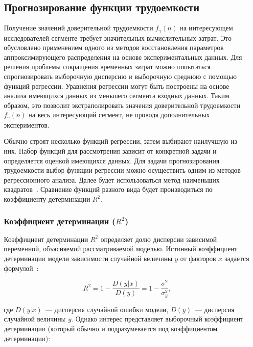 \documentclass[a4paper, article, 14pt]{extarticle}
\begin{document}
\subsection{Прогнозирование функции трудоемкости}\label{sec:compelixy_prediction}

Получение значений доверительной трудоемкости $f_{\gamma}(n)$ на интересующем исследователей сегменте требует значительных вычислительных затрат. Это обусловлено применением одного из методов восстановления параметров аппроксимирующего распределения на основе экспериментальных данных. Для решения проблемы сокращения временных затрат можно попытаться спрогнозировать выборочную дисперсию и выборочную среднюю с помощью функций регрессии. Уравнения регрессии могут быть построены на основе анализа имеющихся данных из меньшего сегмента входных данных. Таким образом, это позволит экстраполировать значения доверительной трудоемкости $f_{\gamma}(n)$ на весь интересующий сегмент, не проводя дополнительных экспериментов.

Обычно строят несколько функций регрессии, затем выбирают наилучшую из них. Набор функций для рассмотрения зависит от конкретной задачи и определяется оценкой имеющихся данных. Для задачи прогнозирования трудоемкости выбор функции регрессии можно осуществить одним из методов регрессионного анализа. Далее будет использоваться метод наименьших квадратов~\cite{hughes}. Сравнение функций разного вида будет производиться по коэффициенту детерминации $R^2$.

\subsubsection{Коэффициент детерминации ($R^2$)}\label{sec:coefficient_of_determination}

Коэффициент детерминации $R^2$ определяет долю дисперсии зависимой переменной, объясняемой рассматриваемой моделью. Истинный коэффициент детерминации модели зависимости случайной величины $y$ от факторов $x$ задается формулой~\cite{hughes}:

\begin{equation}\label{eq:true_coefficient_of_determination}
	R^2 = 1 - \frac{D(y | x)}{D(y)} = 1 - \frac{\sigma^2}{\sigma_y^2},
\end{equation}

\noindent где $D(y | x)$~--- дисперсия случайной ошибки модели, $D(y)$~--- дисперсия случайной величины $y$. Однако интерес представляет выборочный коэффициент детерминации (который обычно и подразумевается под коэффициентом детерминации):
\end{document}
